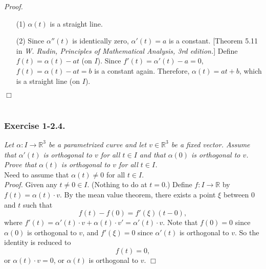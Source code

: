 \documentclass{article}
\begin{document}
\emph{Proof.}
\begin{enumerate}
\item[(1)]
  $\alpha(t)$ is a straight line.

\item[(2)]
  Since $\alpha''(t)$ is identically zero,
  $\alpha'(t) = a$ is a constant.
  [Theorem 5.11 in \emph{W. Rudin, Principles of Mathematical Analysis, 3rd edition.}]
  Define $f(t) = \alpha(t) - at$ (on $I$).
  Since $f'(t) = \alpha'(t) - a = 0$,
  $f(t) = \alpha(t) - at = b$ is a constant again.
  Therefore, $\alpha(t) = at+b$, which is a straight line (on $I$).
\end{enumerate}
$\Box$ \\\\






\subsubsection*{Exercise 1-2.4.}
\emph{Let $\alpha: I \to \mathbb{R}^3$ be a parametrized curve and
let $v \in \mathbb{R}^3$ be a fixed vector.
Assume that $\alpha'(t)$ is orthogonal to $v$ for all $t \in I$
and that $\alpha(0)$ is orthogonal to $v$.
Prove that $\alpha(t)$ is orthogonal to $v$ for all $t \in I$.} \\

Need to assume that $\alpha(t) \neq 0$ for all $t \in I$. \\



\emph{Proof.}
Given any $t \neq 0 \in I$. (Nothing to do at $t = 0$.)
Define $f: I \to \mathbb{R}$ by $f(t) = \alpha(t) \cdot v$.
By the mean value theorem, there exists a point $\xi$ between $0$ and $t$
such that
$$f(t) - f(0) = f'(\xi)(t - 0),$$
where $f'(t) = \alpha'(t) \cdot v + \alpha(t) \cdot v' = \alpha'(t) \cdot v$.
Note that $f(0) = 0$ since $\alpha(0)$ is orthogonal to $v$,
and $f'(\xi) = 0$ since $\alpha'(t)$ is orthogonal to $v$.
So the identity is reduced to
$$f(t) = 0,$$
or $\alpha(t) \cdot v = 0$,
or $\alpha(t)$ is orthogonal to $v$.
$\Box$ \\\\



\end{document}
